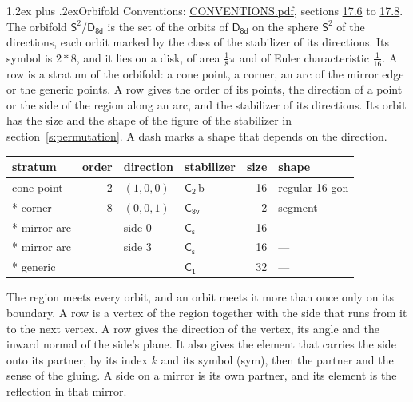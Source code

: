 \documentclass[10pt,a4paper]{article}
\makeatletter
\renewcommand\section{\@startsection{section}{1}{\z@}{-3ex plus -1ex minus -.2ex}%
  {1.2ex plus .2ex}{\normalfont\large\sffamily\bfseries\color{parttitle}}}
\numberwithin{equation}{section}
\newcommand{\grp}[1]{\mathsf{#1}}
\newcommand{\orbname}[1]{#1}
\newcommand{\clsletter}[1]{\,{\scriptsize\color{black!55}#1}}
\newcommand{\dirvec}[3]{(#1, #2, #3)}
\newcommand{\twosphere}{\mathsf{S}^{2}}
\makeatother
\begin{document}
\section{Orbifold}\label{s:orbifold}
Conventions: \href{../../CONVENTIONS.pdf}{CONVENTIONS.pdf}, sections \href{../../CONVENTIONS.pdf\#conv.17.6}{17.6} to \href{../../CONVENTIONS.pdf\#conv.17.8}{17.8}.
The orbifold $\twosphere/\grp{D_{8d}}$ is the set of the orbits of $\grp{D_{8d}}$ on the sphere $\twosphere$ of the directions, each orbit marked by the class of the stabilizer of its directions. Its symbol is $\orbname{2{\ast}8}$, and it lies on a disk, of area $\tfrac{1}{8}\pi$ and of Euler characteristic $\tfrac{1}{16}$.
\leavevmode\label{n:head.stratum}\label{n:head.order.point}\label{n:head.direction}\label{n:head.stabilizer}\label{n:head.size.orbit}\label{n:head.shape}A row is a stratum of the orbifold: a cone point, a corner, an arc of the mirror edge or the generic points. A row gives the order of its points, the direction of a point or the side of the region along an arc, and the stabilizer of its directions. Its orbit has the size and the shape of the figure of the stabilizer in section~\ref{s:permutation}. A dash marks a shape that depends on the direction.
{\small\setlength{\tabcolsep}{4pt}\begin{longtable}{@{}lrllrl@{}}\toprule
stratum & order & direction & stabilizer & size & shape\\\midrule\endhead
\bottomrule\endfoot\endlastfoot
cone point & 2 & $\dirvec{1}{0}{0}$ & \href{C2.pdf}{$\grp{C_{2}}$}\clsletter{b} & 16 & regular 16-gon\\*
corner & 8 & $\dirvec{0}{0}{1}$ & \href{C8v.pdf}{$\grp{C_{8v}}$} & 2 & segment\\*
mirror arc &  & side 0 & \href{C1v.pdf}{$\grp{C_{s}}$} & 16 & ---\\*
mirror arc &  & side 3 & \href{C1v.pdf}{$\grp{C_{s}}$} & 16 & ---\\*
generic &  &  & \href{C1.pdf}{$\grp{C_{1}}$} & 32 & ---\\
\bottomrule\end{longtable}}
\leavevmode\label{n:head.vertex.region}\label{n:head.angle}\label{n:head.normal.side}\label{n:head.partner}\label{n:head.sense}The region meets every orbit, and an orbit meets it more than once only on its boundary. A row is a vertex of the region together with the side that runs from it to the next vertex. A row gives the direction of the vertex, its angle and the inward normal of the side's plane. It also gives the element that carries the side onto its partner, by its index $k$ and its symbol (sym), then the partner and the sense of the gluing. A side on a mirror is its own partner, and its element is the reflection in that mirror.
\end{document}
